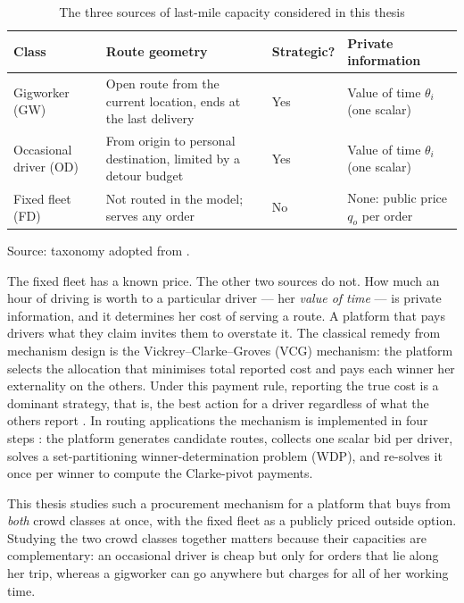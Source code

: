 \begin{table}[t]
\centering
\caption{The three sources of last-mile capacity considered in this thesis}
\label{tab:classes}
\small
\begin{tabular}{P{2.5cm}P{4.3cm}P{2.0cm}P{5.0cm}}
\toprule
Class & Route geometry & Strategic? & Private information\\
\midrule
Gigworker (GW) & Open route from the current location, ends at the last delivery & Yes & Value of time $\theta_i$ (one scalar)\\
Occasional driver (OD) & From origin to personal destination, limited by a detour budget & Yes & Value of time $\theta_i$ (one scalar)\\
Fixed fleet (FD) & Not routed in the model; serves any order & No & None: public price $q_o$ per order\\
\bottomrule
\end{tabular}
\par\smallskip\footnotesize Source: taxonomy adopted from \citet{luy2024workforce}.
\end{table}

The fixed fleet has a known price. The other two sources do not. How much
an hour of driving is worth to a particular driver --- her \emph{value of
time} --- is private information, and it determines her cost of serving a
route. A platform that pays drivers what they claim invites them to
overstate it. The classical remedy from mechanism design is the
Vickrey--Clarke--Groves (VCG) mechanism: the platform selects the
allocation that minimises total reported cost and pays each winner her
externality on the others. Under this payment rule, reporting the true cost
is a dominant strategy, that is, the best action for a driver regardless of
what the others report \citep{nisan2007agt}. In routing applications the
mechanism is implemented in four steps \citep{zou2022mechanisms,li2026auction}:
the platform generates candidate routes, collects one scalar bid per driver,
solves a set-partitioning winner-determination problem (WDP), and re-solves
it once per winner to compute the Clarke-pivot payments.

This thesis studies such a procurement mechanism for a platform that buys
from \emph{both} crowd classes at once, with the fixed fleet as a publicly
priced outside option. Studying the two crowd classes together matters because their capacities
are complementary: an occasional driver is cheap but only for orders that
lie along her trip, whereas a gigworker can go anywhere but charges for all
of her working time.

